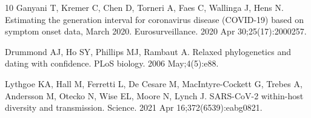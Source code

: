 \documentclass[11pt,a4paper]{article}
\begin{document}
\begin{thebibliography}{10}
	Ganyani T, Kremer C, Chen D, Torneri A, Faes C, Wallinga J, Hens N. Estimating the generation interval for coronavirus disease (COVID-19) based on symptom onset data, March 2020. Eurosurveillance. 2020 Apr 30;25(17):2000257.

	Drummond AJ, Ho SY, Phillips MJ, Rambaut A. Relaxed phylogenetics and dating with confidence. PLoS biology. 2006 May;4(5):e88.

	Lythgoe KA, Hall M, Ferretti L, De Cesare M, MacIntyre-Cockett G, Trebes A, Andersson M, Otecko N, Wise EL, Moore N, Lynch J. SARS-CoV-2 within-host diversity and transmission. Science. 2021 Apr 16;372(6539):eabg0821.

\end{thebibliography}
\end{document}
